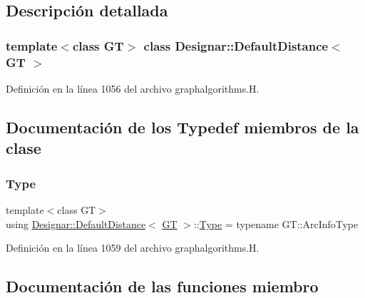 \subsection{Descripción detallada}
\subsubsection*{template$<$class GT$>$\newline
class Designar\+::\+Default\+Distance$<$ G\+T $>$}



Definición en la línea 1056 del archivo graphalgorithms.\+H.



\subsection{Documentación de los \textquotesingle{}Typedef\textquotesingle{} miembros de la clase}
\mbox{\label{class_designar_1_1_default_distance_a9317a5edf566779550b96edd532b502b}} 
\subsubsection{\texorpdfstring{Type}{Type}}
{\footnotesize\ttfamily template$<$class GT$>$ \\
using \hyperlink{class_designar_1_1_default_distance}{Designar\+::\+Default\+Distance}$<$ \hyperlink{demo-buildgraph_8_c_a3001c40d2c31ca87ed96cd7d1334a55e}{GT} $>$\+::\hyperlink{class_designar_1_1_default_distance_a9317a5edf566779550b96edd532b502b}{Type} =  typename G\+T\+::\+Arc\+Info\+Type}



Definición en la línea 1059 del archivo graphalgorithms.\+H.



\subsection{Documentación de las funciones miembro}
\mbox{\label{class_designar_1_1_default_distance_ac601666aabb51229c4ceff72cd7d82db}} 

